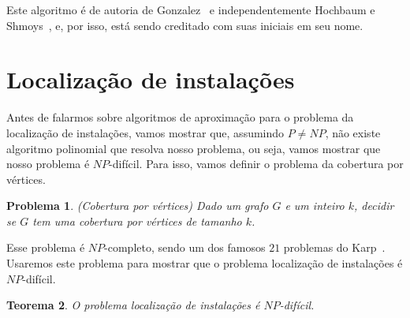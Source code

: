 \documentclass[12pt]{article}
\newtheorem{theorem}{Teorema}[section]
\newtheorem{problem}[theorem]{Problema}
\newcommand{\NP}{\mathit{NP}}
\begin{document}
Este algoritmo é de autoria de Gonzalez~\cite{GONZALEZ1985293} e independentemente Hochbaum e Shmoys~\cite{HSBottle}, e, por isso, está sendo creditado com suas iniciais em seu nome. 
\newpage
\section{Localização de instalações}
Antes de falarmos sobre algoritmos de aproximação para o problema da localização de instalações, vamos mostrar que, assumindo $P\neq\NP$, não existe algoritmo polinomial que resolva nosso problema, ou seja, vamos mostrar que nosso problema é $\NP$-difícil. Para isso, vamos definir o problema da cobertura por vértices.



\begin{problem}(Cobertura por vértices)
    Dado um grafo $G$ e um inteiro $k$, decidir se $G$ tem uma cobertura por vértices de tamanho $k$.
\end{problem}
Esse problema é $\NP$-completo, sendo um dos famosos $21$ problemas do Karp~\cite{Karp1972}. Usaremos este problema para mostrar que o problema localização de instalações é $\NP$-difícil.

\begin{theorem}
    O problema localização de instalações é $\NP$-difícil.
\end{theorem}
\end{document}
